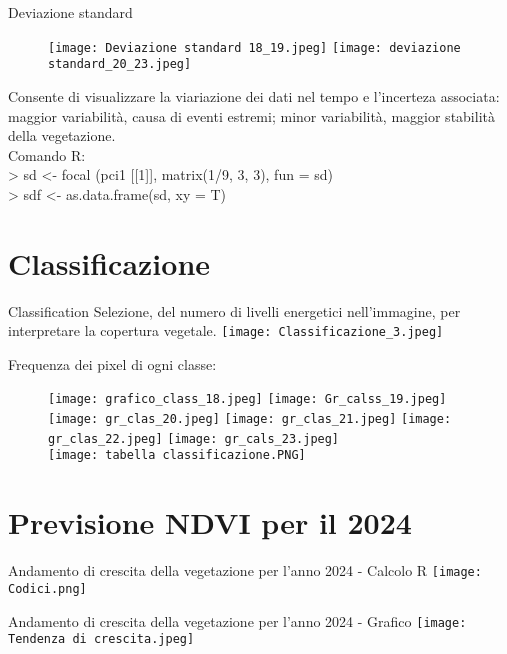 \documentclass[10pt]{beamer}
\begin{document}
\begin{frame}{Deviazione standard}
\begin{figure}
        \centering
        \texttt{[image: Deviazione standard 18\_19.jpeg]}
        \texttt{[image: deviazione standard\_20\_23.jpeg]} 
    \end{figure}
      \item Consente di visualizzare la viariazione dei dati nel tempo e l'incerteza associata: maggior variabilità, causa di eventi estremi; minor variabilità, maggior stabilità della vegetazione.\\
      Comando R: \\
      > sd <- focal (pci1 [[1]], matrix(1/9, 3, 3), fun = sd)\\
      > sdf <- as.data.frame(sd, xy = T)
\end{frame}


\section{Classificazione}
\begin{frame}{Classification}
Selezione, del numero di livelli energetici nell'immagine, per interpretare la copertura vegetale.
\texttt{[image: Classificazione\_3.jpeg]}
\end{frame}
\begin{frame}
Frequenza dei pixel di ogni classe:
\begin{figure}
        \centering
        \texttt{[image: grafico\_class\_18.jpeg]}
        \texttt{[image: Gr\_calss\_19.jpeg]} 
        \texttt{[image: gr\_clas\_20.jpeg]}
        \texttt{[image: gr\_clas\_21.jpeg]}
        \texttt{[image: gr\_clas\_22.jpeg]} 
        \texttt{[image: gr\_cals\_23.jpeg]}\\
        \texttt{[image: tabella classificazione.PNG]}
    \end{figure}
\end{frame}

\section{Previsione NDVI per il 2024}
\begin{frame}{Andamento di crescita della vegetazione per l'anno 2024 - Calcolo R }
\centering
\texttt{[image: Codici.png]}
\end{frame}
\begin{frame}{Andamento di crescita della vegetazione per l'anno 2024 - Grafico}
\centering
\texttt{[image: Tendenza di crescita.jpeg]}
\end{frame}
\end{document}
